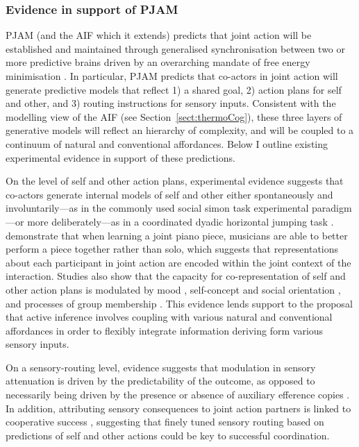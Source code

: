 \subsubsection{Evidence in support of PJAM}
PJAM (and the AIF which it extends) predicts that joint action will be established and maintained through generalised synchronisation between two or more predictive brains driven by an overarching mandate of free energy minimisation \citep{Friston2015}.  In particular, PJAM predicts that co-actors in joint action will generate predictive models that reflect 1) a shared goal, 2) action plans for self and other, and 3) routing instructions for sensory inputs.  Consistent with the modelling view of the AIF (see Section~\ref{sect:thermoCog}), these three layers of generative models will reflect an hierarchy of complexity, and will be coupled to a continuum of natural and conventional affordances.  Below I outline existing experimental evidence in support of these predictions.





On the level of self and other action plans, experimental evidence suggests that co-actors generate internal models of self and other either spontaneously and involuntarily---as in the commonly used social simon task experimental paradigm \citep{Sebanz2003,Atmaca2008}---or more deliberately---as in a coordinated dyadic horizontal jumping task \citep{Vesper2012}.  \textcite{Loehr2016} demonstrate that when learning a joint piano piece, musicians are able to better perform a piece together rather than solo, which suggests that representations about each participant in joint action are encoded within the joint context of the interaction.
Studies also show that the capacity for co-representation of self and other action plans is modulated by mood \citep[positive or negative affect, see][]{Kuhbandner2010}, self-concept and social orientation \citep{Colzato2012,Colzato2012a}, and processes of group membership \citep{DeBruijn2008,Aquino2015}. This evidence lends support to the proposal that active inference involves coupling with various natural and conventional affordances in order to flexibly integrate information deriving form various sensory inputs.


On a sensory-routing level, evidence suggests that modulation in sensory attenuation is driven by the predictability of the outcome, as opposed to necessarily being driven by the presence or absence of auxiliary efference copies \citep{Sato2008}.  In addition, attributing sensory consequences to joint action partners is linked to cooperative success \citep{Chaminade2012}, suggesting that finely tuned sensory routing based on predictions of self and other actions could be key to successful coordination.





















